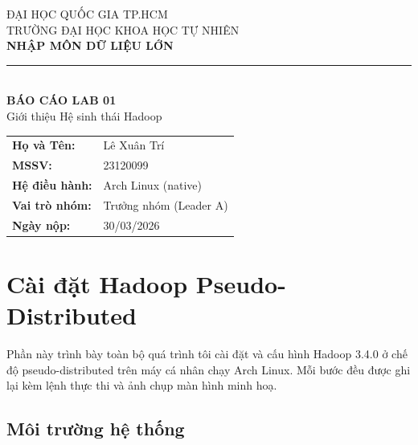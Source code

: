 \documentclass[12pt,a4paper]{article}
\begin{document}
\begin{titlepage}
  \centering
  \thispagestyle{empty}
  {\large ĐẠI HỌC QUỐC GIA TP.HCM}\\[0.2cm]
  {\large TRƯỜNG ĐẠI HỌC KHOA HỌC TỰ NHIÊN}\\[1cm]
  {\Large\bfseries NHẬP MÔN DỮ LIỆU LỚN}\\[0.5cm]
  \rule{\textwidth}{0.4pt}\\[1cm]
  {\LARGE\bfseries BÁO CÁO LAB 01}\\[0.3cm]
  {\Large Giới thiệu Hệ sinh thái Hadoop}\\[2cm]
  \begin{tabular}{ll}
    \textbf{Họ và Tên:}      & Lê Xuân Trí \\[0.3cm]
    \textbf{MSSV:}            & 23120099 \\[0.3cm]
    \textbf{Hệ điều hành:}    & Arch Linux (native) \\[0.3cm]
    \textbf{Vai trò nhóm:}    & Trưởng nhóm (Leader A) \\[0.3cm]
    \textbf{Ngày nộp:}        & 30/03/2026 \\
  \end{tabular}
\end{titlepage}

\newpage
\tableofcontents
\newpage
\pagestyle{plain}

\section{Cài đặt Hadoop Pseudo-Distributed}

Phần này trình bày toàn bộ quá trình tôi cài đặt và cấu hình Hadoop 3.4.0 ở chế độ
pseudo-distributed trên máy cá nhân chạy Arch Linux. Mỗi bước đều được ghi lại kèm
lệnh thực thi và ảnh chụp màn hình minh hoạ.

\subsection{Môi trường hệ thống}
\end{document}
